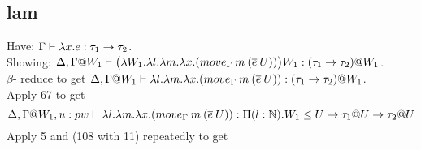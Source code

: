 \message{ !name(paper.tex)}\documentclass{article}
\begin{document}
\subsection{lam}
Have: $\Gamma \vdash \lambda x. e : \tau_1 \rightarrow \tau_2$. \\
Showing: $\Delta,\Gamma@W_1 \vdash \big(\lambda W_1. \lambda l. \lambda m . \lambda x. (move_{\Gamma}\:m\:(\overline{e} \: U)) \big) W_1 : (\tau_1 \imp \tau_2) @ W_1$. \\
$\beta$- reduce to get 
 $\Delta,\Gamma@W_1 \vdash  \lambda l. \lambda m . \lambda x. (move_{\Gamma}\:m\:(\overline{e} \: U)) : (\tau_1 \imp \tau_2) @ W_1$.\\
 Apply 67 to get 
 \[\Delta,\Gamma@W_1, u: pw \vdash  \lambda l. \lambda m . \lambda x. (move_{\Gamma}\:m\:(\overline{e} \: U)) : \Pi(l:\N).W_1 \leq U \imp \tau_1@U \imp \tau_2@U\]
 Apply 5 and (108 with 11) repeatedly to get
\end{document}
